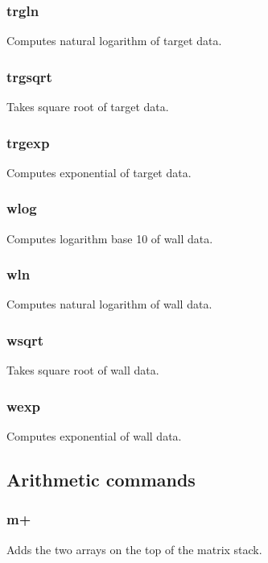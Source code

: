 \documentclass[a4paper,10pt]{report}
\begin{document}
\subsubsection{trgln}\label{sec:trgln}
Computes natural logarithm of target data.

\subsubsection{trgsqrt}\label{sec:trgsqrt}
Takes square root of target data.

\subsubsection{trgexp}\label{sec:trgexp}
Computes exponential of target data.

\subsubsection{wlog}\label{sec:wlog}
Computes logarithm base 10 of wall data.

\subsubsection{wln}\label{sec:wln}
Computes natural logarithm of wall data.

\subsubsection{wsqrt}\label{sec:wsqrt}
Takes square root of wall data.

\subsubsection{wexp}\label{sec:wexp}
Computes exponential of wall data.


\subsection{Arithmetic commands}\label{sec:arithmetic}

\subsubsection{m+}\label{sec:m+}
Adds the two arrays on the top of the matrix stack.
\end{document}
